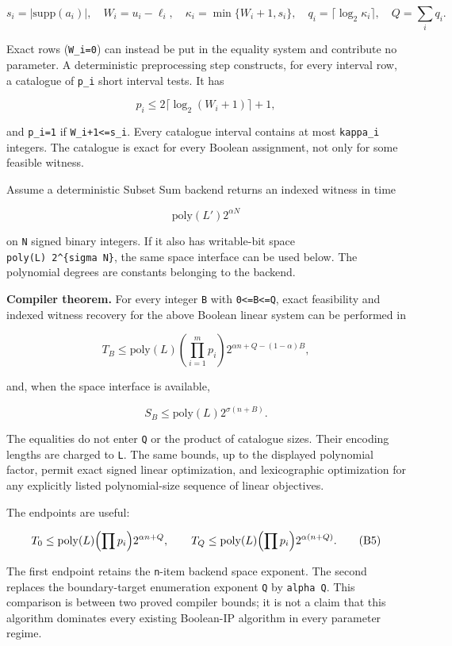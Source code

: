 \[
s_i=|\mathrm{supp}(a_i)|,\quad W_i=u_i-\ell_i,\quad
\kappa_i=\min\{W_i+1,s_i\},\quad
q_i=\lceil\log_2\kappa_i\rceil,\quad Q=\sum_i q_i.
\tag{B1}
\]

Exact rows (\texttt{W\_i=0}) can instead be put in the equality system and contribute no parameter. A deterministic preprocessing step constructs, for every interval row, a catalogue of \texttt{p\_i} short interval tests. It has

\[
p_i\le 2\lceil\log_2(W_i+1)\rceil+1,
\tag{B2}
\]

and \texttt{p\_i=1} if \texttt{W\_i+1\textless{}=s\_i}. Every catalogue interval contains at most \texttt{kappa\_i} integers. The catalogue is exact for every Boolean assignment, not only for some feasible witness.

Assume a deterministic Subset Sum backend returns an indexed witness in time

\[
\mathrm{poly}(L')2^{\alpha N}
\]

on \texttt{N} signed binary integers. If it also has writable-bit space \texttt{poly(L\textquotesingle{})\ 2\^{}\{sigma\ N\}}, the same space interface can be used below. The polynomial degrees are constants belonging to the backend.

\textbf{Compiler theorem.} For every integer \texttt{B} with \texttt{0\textless{}=B\textless{}=Q}, exact feasibility and indexed witness recovery for the above Boolean linear system can be performed in

\[
T_B\le\mathrm{poly}(L)\left(\prod_{i=1}^m p_i\right)
2^{\alpha n+Q-(1-\alpha)B},
\tag{B3}
\]

and, when the space interface is available,

\[
S_B\le\mathrm{poly}(L)2^{\sigma(n+B)}.
\tag{B4}
\]

The equalities do not enter \texttt{Q} or the product of catalogue sizes. Their encoding lengths are charged to \texttt{L}. The same bounds, up to the displayed polynomial factor, permit exact signed linear optimization, and lexicographic optimization for any explicitly listed polynomial-size sequence of linear objectives.

The endpoints are useful:

\[
T_0\le\mathrm{poly}(L)\Bigl(\prod p_i\Bigr)2^{\alpha n+Q},
\qquad
T_Q\le\mathrm{poly}(L)\Bigl(\prod p_i\Bigr)2^{\alpha(n+Q)}.
\tag{B5}
\]

The first endpoint retains the \texttt{n}-item backend space exponent. The second replaces the boundary-target enumeration exponent \texttt{Q} by \texttt{alpha\ Q}. This comparison is between two proved compiler bounds; it is not a claim that this algorithm dominates every existing Boolean-IP algorithm in every parameter regime.

